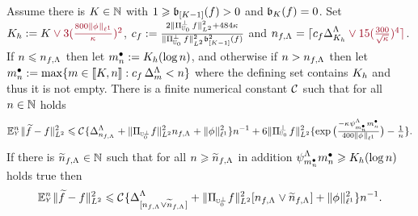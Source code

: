 \begin{lm}\label{re:ub:co2} Assume there is $K\in\Nz$
  with   $1\geq \bias[{[K-1] }](\xdf)>0$ and $\bias[K](\xdf)=0$. Set
 $K_{\ydf}:=K\dr\vee
3(\tfrac{800\Vnormlp[1]{\fydf}}{\cpen})^2$, $c_{\xdf}:=\tfrac{2\VnormLp{\Proj[{\mHiH[0]}]^\perp\xdf}^2+484\cpen}{\VnormLp{\Proj[{\mHiH[0]}]^\perp\xdf}^2\bias[{[K-1]}]^2(\xdf)}$
and
$\ssY_{\xdf,\iSv}=\ceil{c_{\xdf}\DipenSv[K_{\ydf}]\dr\vee15(\tfrac{300}{\sqrt{\cpen}})^4}$.\\
If $\ssY\leq\ssY_{\xdf,\iSv}$ then let $\sDi{\ssY}:=K_{\ydf}(\log
n)$, and otherwise if  $\ssY>\ssY_{\xdf,\iSv}$ then let
$\sDi{\ssY}:=\max\{\Di\in\nset{K,\ssY}:c_{\xdf}\,\DipenSv<\ssY\}$
where the defining set contains $K_{\ydf}$ and thus it is not empty.
There is a finite numerical constant $\cst{}$ such that for all $\ssY\in\Nz$ holds
\begin{equation}\label{re:ub:co2:e1}
\FuEx[\ssY]{\rY}\VnormLp{\txdf-\xdf}^2
\leq\cst{}\{\DipenSv[\ssY_{\xdf,\iSv}]+\VnormLp{\Proj[{\mHiH[0]^\perp}]\xdf}^2\ssY_{\xdf,\iSv}+ \Vnormlp[1]{\fydf}^2\}\ssY^{-1}
+ 6\VnormLp{\Proj[{\mHiH[0]}]^\perp\xdf}^2\{ \exp\big(\tfrac{-\cpen\cmSv[\sDi{\ssY}]\sDi{\ssY}}{400\Vnormlp[1]{\fydf}}\big)-\tfrac{1}{\ssY}\}.
\end{equation}
If there is $\widetilde{\ssY}_{\xdf,\iSv}\in\Nz$ such that for all
$\ssY\geq\widetilde{\ssY}_{\xdf,\iSv}$ in addition
$\cmiSv[\sDi{\ssY}]\sDi{\ssY}\geq K_{\ydf}(\log\ssY)$  holds true then  
\begin{equation}\label{re:ub:co2:e2}
\FuEx[\ssY]{\rY}\VnormLp{\txdf-\xdf}^2
\leq\cst{}\{\DipenSv[{[\ssY_{\xdf,\iSv}\vee\widetilde{\ssY}_{\xdf,\iSv}]}]+\VnormLp{\Proj[{\mHiH[0]^\perp}]\xdf}^2[\ssY_{\xdf,\iSv}\vee\widetilde{\ssY}_{\xdf,\iSv}]+ \Vnormlp[1]{\fydf}^2\}\ssY^{-1}.
\end{equation}
\end{lm}
